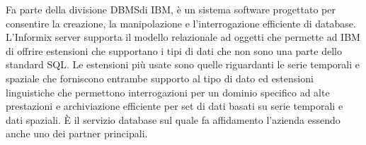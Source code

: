 Fa parte della divisione DBMS\glosp di IBM\glosp, è un sistema software progettato per consentire la creazione, la manipolazione e l'interrogazione efficiente di database.
L'Informix server supporta il modello relazionale ad oggetti che permette ad IBM di offrire estensioni che supportano i tipi di dati che non sono una parte dello standard SQL\glo.
Le estensioni più usate sono quelle riguardanti le serie temporali e spaziale che forniscono entrambe supporto al tipo di dato ed estensioni linguistiche che permettono 
interrogazioni per un dominio specifico ad alte prestazioni e archiviazione efficiente per set di dati basati su serie temporali e dati spaziali.
È il servizio database sul quale fa affidamento l'azienda essendo anche uno dei partner principali.